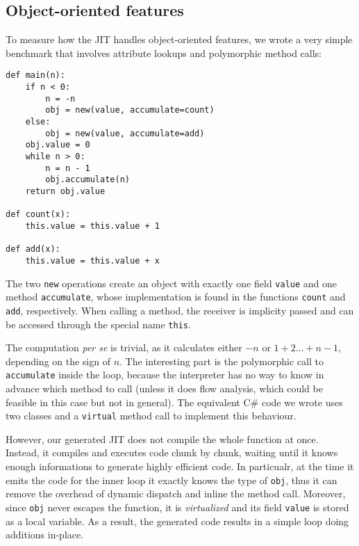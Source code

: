 \subsection{Object-oriented features}

To measure how the JIT handles object-oriented features, we wrote a very
simple benchmark that involves attribute lookups and polymorphic method calls:

\begin{lstlisting}
def main(n):
    if n < 0:
        n = -n
        obj = new(value, accumulate=count)
    else:
        obj = new(value, accumulate=add)
    obj.value = 0
    while n > 0:
        n = n - 1
        obj.accumulate(n)
    return obj.value

def count(x):
    this.value = this.value + 1

def add(x):
    this.value = this.value + x
\end{lstlisting}

The two \lstinline{new} operations create an object with exactly one field
\lstinline{value} and one method \lstinline{accumulate}, whose implementation
is found in the functions \lstinline{count} and \lstinline{add}, respectively.
When calling a method, the receiver is implicity passed and can be accessed
through the special name \lstinline{this}.

The computation \emph{per se} is trivial, as it calculates either $-n$ or
$1+2...+n-1$, depending on the sign of $n$. The interesting part is the
polymorphic call to \lstinline{accumulate} inside the loop, because the interpreter has
no way to know in advance which method to call (unless it does flow analysis,
which could be feasible in this case but not in general).  The equivalent C\#
code we wrote uses two classes and a \lstinline{virtual} method call to
implement this behaviour.

However, our generated JIT does not compile the whole function at
once. Instead, it compiles and executes code chunk by chunk, waiting until it
knows enough informations to generate highly efficient code.  In particualr,
at the time it emits the code for the inner loop it exactly knows the
type of \lstinline{obj}, thus it can remove the overhead of dynamic dispatch
and inline the method call.  Moreover, since \lstinline{obj} never escapes the
function, it is \emph{virtualized} and its field \lstinline{value} is stored
as a local variable.  As a result, the generated code results in a simple loop
doing additions in-place.

